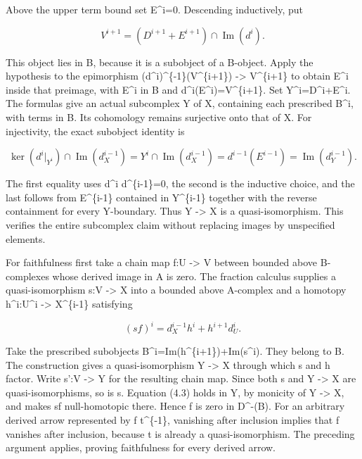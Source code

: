 Above the upper term bound set E\textasciicircum{}i\allowbreak{}=0. Descending inductively,\allowbreak{} put

\[
 V^{i+1}=(D^{i+1}+E^{i+1})\cap\operatorname{Im}(d^i).
\]

This object lies in B,\allowbreak{} because it is a subobject of a B-object. Apply the hypothesis to the epimorphism (d\textasciicircum{}i)\allowbreak{}\textasciicircum{}\{-1\}(V\textasciicircum{}\{i\allowbreak{}+1\})\allowbreak{} \allowbreak{}-> V\textasciicircum{}\{i\allowbreak{}+1\} to obtain E\^{}i inside that preimage,\allowbreak{} with E\^{}i in B and d\textasciicircum{}i(E\textasciicircum{}i)\allowbreak{}\allowbreak{}=V\textasciicircum{}\{i\allowbreak{}+1\}. Set Y\textasciicircum{}i\allowbreak{}=D\textasciicircum{}i\allowbreak{}+E\textasciicircum{}i. The formulas give an actual subcomplex Y of X,\allowbreak{} containing each prescribed B\textasciicircum{}i,\allowbreak{} with terms in B. Its cohomology remains surjective onto that of X. For injectivity,\allowbreak{} the exact subobject identity is

\[
 \ker(d^i|_{Y^i})\cap\operatorname{Im}(d^{i-1}_X)
   =Y^i\cap\operatorname{Im}(d^{i-1}_X)
   =d^{i-1}(E^{i-1})=\operatorname{Im}(d^{i-1}_Y).        \tag{4.2}
\]

The first equality uses d\^{}i d\textasciicircum{}\{i-1\}\allowbreak{}=0,\allowbreak{} the second is the inductive choice,\allowbreak{} and the last follows from E\^{}\{i-1\} contained in Y\^{}\{i-1\} together with the reverse containment for every Y-boundary. Thus Y \allowbreak{}-> X is a quasi-isomorphism. This verifies the entire subcomplex claim without replacing images by unspecified elements.

For faithfulness first take a chain map f:\allowbreak{}U \allowbreak{}-> V between bounded above B-complexes whose derived image in A is zero. The fraction calculus supplies a quasi-isomorphism s:\allowbreak{}V \allowbreak{}-> X into a bounded above A-complex and a homotopy h\textasciicircum{}i:\allowbreak{}U\textasciicircum{}i \allowbreak{}-> X\^{}\{i-1\} satisfying

\[
 (sf)^i=d_X^{i-1}h^i+h^{i+1}d_U^i.                      \tag{4.3}
\]

Take the prescribed subobjects B\textasciicircum{}i\allowbreak{}=Im(h\textasciicircum{}\{i\allowbreak{}+1\})\allowbreak{}\allowbreak{}+Im(s\textasciicircum{}i)\allowbreak{}. They belong to B. The construction gives a quasi-isomorphism Y \allowbreak{}-> X through which s and h factor. Write s':\allowbreak{}V \allowbreak{}-> Y for the resulting chain map. Since both s and Y \allowbreak{}-> X are quasi-isomorphisms,\allowbreak{} so is s\textquotesingle. Equation (4.3)\allowbreak{} holds in Y,\allowbreak{} by monicity of Y \allowbreak{}-> X,\allowbreak{} and makes s\textquotesingle f null-homotopic there. Hence f is zero in D\textasciicircum{}-(B)\allowbreak{}. For an arbitrary derived arrow represented by f t\textasciicircum{}\{-1\},\allowbreak{} vanishing after inclusion implies that f vanishes after inclusion,\allowbreak{} because t is already a quasi-isomorphism. The preceding argument applies,\allowbreak{} proving faithfulness for every derived arrow.

